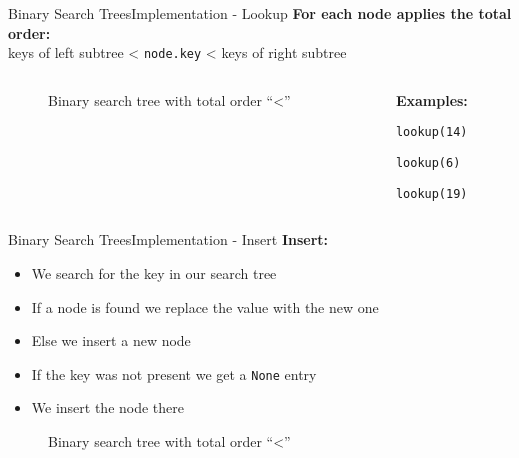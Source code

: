 \begin{frame}{Binary Search Trees}{Implementation - Lookup}
  \textbf{For each node applies the total order:}\\
  \hspace{1.5em}keys of left subtree
  < \texttt{\color{Mittel-Blau}node.key} < keys of right 
  subtree
  \begin{columns}
    \begin{column}{0.77\linewidth}
      \begin{figure}
        \begin{adjustbox}{width=\linewidth}
          
        \end{adjustbox}
        \caption{Binary search tree with total order
          \enquote{\color{Mittel-Blau}<}}
        \label{fig:binary_search_trees:binary_tree_lookup}
      \end{figure}
    \end{column}
    \begin{column}{0.23\linewidth}
      \textbf{Examples:}
      \begin{compactitem}[{\color{Uni-Grau}\footnotesize$\blacksquare$}]
        \item<4->
          \texttt{\color{red}lookup(14)}
        \item<5->
          \texttt{\color{Mittel-Gruen!50!blue}lookup(6)}
        \item<6->
          \texttt{\color{yellow!50!orange}lookup(19)}
      \end{compactitem}
    \end{column}
  \end{columns}
\end{frame}


\begin{frame}{Binary Search Trees}{Implementation - Insert}
  \textbf{Insert:}
  \begin{itemize}
    \item<2->
      We search for the key in our search tree
    \item<3->
      If a node is found we replace the value with the new one
    \item<4->
      Else we insert a new node
    \item<5->If the key was not present we get a \texttt{\color{Mittel-Blau}None} entry
    \item<6->We insert the node there  
  \end{itemize}
  \vspace{-1em}
  \begin{figure}
    
    \caption{Binary search tree with total order
      \enquote{\color{Mittel-Blau}<}}
    \label{fig:binary_search_trees:binary_tree_insert}
  \end{figure}
\end{frame}

